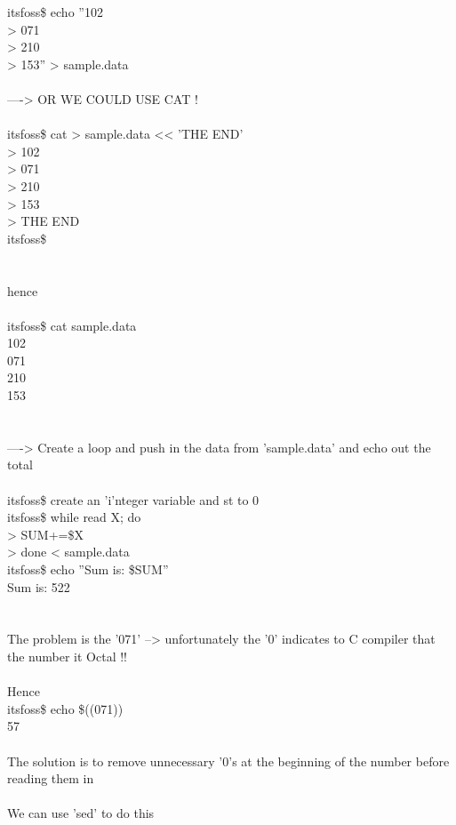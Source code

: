 \documentclass[10pt,a4paper]{article}
\begin{document}
{itsfoss\$ echo ''102\\
> 071\\
> 210\\
> 153'' > sample.data\\
\\
----> OR WE COULD USE CAT !\\
\\
itsfoss\$ cat > sample.data << 'THE END'\\
> 102\\
> 071\\
> 210\\
> 153\\
> THE END\\
itsfoss\$ \\
\\
\\
hence\\
\\
itsfoss\$ cat sample.data  \\
102\\
071\\
210\\
153\\
\\
\\
----> Create a loop and push in the data from 'sample.data' and echo out the total\\
  \\
itsfoss\$ 			create an 'i'nteger variable and st to 0\\
itsfoss\$ while read X; do\\
> SUM+=\$X\\
> done < sample.data\\
itsfoss\$ echo ''Sum is: \$SUM''\\
Sum is: 522\\
\\
\\
The problem is the '071' --> unfortunately  the '0' indicates to C compiler that the number it Octal !!\\
\\
Hence\\
itsfoss\$ echo \$((071))\\
57\\
\\
The solution is to remove unnecessary '0's at the beginning of the number before reading them in\\
\\
We can use 'sed' to do this\\
\\
}
\end{document}
